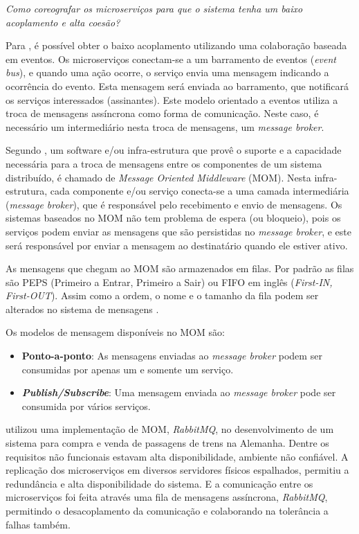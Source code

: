 \documentclass[12pt]{article}
\theoremstyle{plain}
\begin{document}
\emph{Como coreografar os microserviços para que o sistema tenha um baixo acoplamento e alta coesão?}

Para \cite{damore:2018, Newman:15}, é possível obter o baixo acoplamento utilizando uma colaboração baseada em eventos. Os microserviços conectam-se a um barramento de eventos (\textit{event bus}), e quando uma ação ocorre, o serviço envia uma mensagem indicando a ocorrência do evento. Esta mensagem será enviada ao barramento, que notificará os serviços interessados (assinantes). Este modelo orientado a eventos utiliza a troca de mensagens assíncrona como forma de comunicação. Neste caso, é necessário um intermediário nesta troca de mensagens, um \textit{message broker}. 

Segundo \cite{Curry2004}, um software e/ou infra-estrutura que provê o suporte e a capacidade necessária para a troca de mensagens entre os componentes de um sistema distribuído, é chamado de \textit{Message Oriented Middleware} (MOM). Nesta infra-estrutura, cada componente e/ou serviço conecta-se a uma camada intermediária (\textit{message broker}), que é responsável pelo recebimento e envio de mensagens. Os sistemas baseados no MOM não tem problema de espera (ou bloqueio), pois os serviços podem enviar as mensagens que são persistidas no \textit{message broker}, e este será responsável por enviar a mensagem ao destinatário quando ele estiver ativo.

As mensagens que chegam ao MOM são armazenados em filas. Por padrão as filas são PEPS (Primeiro a Entrar, Primeiro a Sair) ou FIFO em inglês (\textit{First-IN, First-OUT}). Assim como a ordem, o nome e o tamanho da fila podem ser alterados no sistema de mensagens \cite{Curry2004}.  

Os modelos de mensagem disponíveis no MOM são:
\begin{itemize}
    \item \textbf{Ponto-a-ponto}: As mensagens enviadas ao \textit{message broker} podem ser consumidas por apenas um e somente um serviço.
    \item \textbf{\textit{Publish/Subscribe}}: Uma mensagem enviada ao \textit{message broker} pode ser consumida por vários serviços.
\end{itemize}

\cite{richter:2017} utilizou uma implementação de MOM, \textit{RabbitMQ}, no desenvolvimento de um sistema para compra e venda de passagens de trens na Alemanha. Dentre os requisitos não funcionais estavam alta disponibilidade, ambiente não confiável. A replicação dos microserviços em diversos servidores físicos espalhados, permitiu a redundância e alta disponibilidade do sistema. E a comunicação entre os microserviços foi feita através uma fila de mensagens assíncrona, \textit{RabbitMQ}, permitindo o desacoplamento da comunicação e colaborando na tolerância a falhas também.
\end{document}
